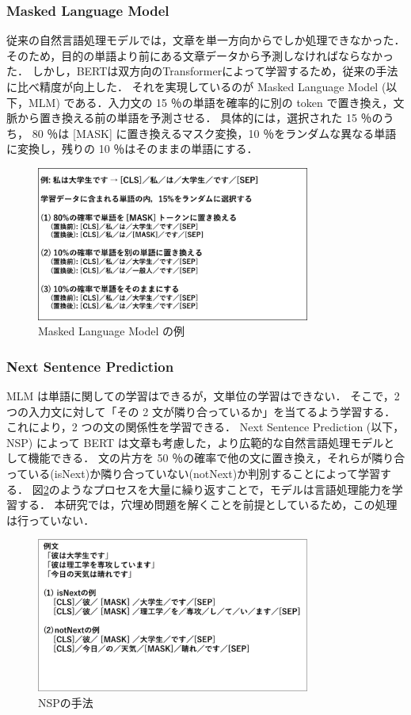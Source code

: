 \subsubsection{Masked Language Model}
従来の自然言語処理モデルでは，文章を単一方向からでしか処理できなかった．
そのため，目的の単語より前にある文章データから予測しなければならなかった．
しかし，BERTは双方向のTransformerによって学習するため，従来の手法に比べ精度が向上した．
それを実現しているのが Masked Language Model (以下，MLM) である．入力文の 15 ％の単語を確率的に別の token で置き換え，文脈から置き換える前の単語を予測させる．
具体的には，選択された 15 ％のうち， 80 ％は [MASK] に置き換えるマスク変換，10 ％をランダムな異なる単語に変換し，残りの 10 ％はそのままの単語にする．

\begin{figure}[H]
	\centering
	\includegraphics[width=90mm]{image/BERT-mlm.png}
	\caption{Masked Language Model の例}
	\label{mlm}
\end{figure}

\subsubsection{Next Sentence Prediction}
MLM は単語に関しての学習はできるが，文単位の学習はできない．
そこで，2 つの入力文に対して「その 2 文が隣り合っているか」を当てるよう学習する．
これにより，2 つの文の関係性を学習できる．
Next Sentence Prediction (以下，NSP) によって BERT は文章も考慮した，より広範的な自然言語処理モデルとして機能できる．
文の片方を 50 ％の確率で他の文に置き換え，それらが隣り合っている(isNext)か隣り合っていない(notNext)か判別することによって学習する．
図\ref{nsp}のようなプロセスを大量に繰り返すことで，モデルは言語処理能力を学習する．
本研究では，穴埋め問題を解くことを前提としているため，この処理は行っていない．

\begin{figure}[H]
	\centering
	\includegraphics[width=90mm]{image/BERT-nsp.png}
	\caption{NSPの手法}
	\label{nsp}
\end{figure}

